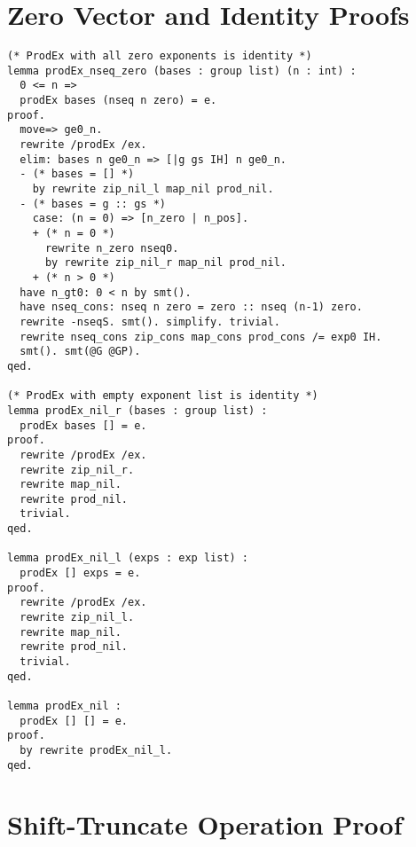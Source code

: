 \section{Zero Vector and Identity Proofs}
\label{sec:zero-vector-proofs}

\begin{lstlisting}[style=easycrypt, caption=Proof of Zero Vector Properties, breaklines=true, breakatwhitespace=true, frame=single, keepspaces=true]
(* ProdEx with all zero exponents is identity *)
lemma prodEx_nseq_zero (bases : group list) (n : int) :
  0 <= n =>
  prodEx bases (nseq n zero) = e.
proof.
  move=> ge0_n.
  rewrite /prodEx /ex.
  elim: bases n ge0_n => [|g gs IH] n ge0_n.
  - (* bases = [] *)
    by rewrite zip_nil_l map_nil prod_nil.
  - (* bases = g :: gs *)
    case: (n = 0) => [n_zero | n_pos].
    + (* n = 0 *)
      rewrite n_zero nseq0.
      by rewrite zip_nil_r map_nil prod_nil.
    + (* n > 0 *)
  have n_gt0: 0 < n by smt().
  have nseq_cons: nseq n zero = zero :: nseq (n-1) zero.  
  rewrite -nseqS. smt(). simplify. trivial.
  rewrite nseq_cons zip_cons map_cons prod_cons /= exp0 IH. 
  smt(). smt(@G @GP).
qed.

(* ProdEx with empty exponent list is identity *)
lemma prodEx_nil_r (bases : group list) :
  prodEx bases [] = e.
proof.
  rewrite /prodEx /ex.
  rewrite zip_nil_r.
  rewrite map_nil.
  rewrite prod_nil.
  trivial.
qed.

lemma prodEx_nil_l (exps : exp list) :
  prodEx [] exps = e.
proof.
  rewrite /prodEx /ex.
  rewrite zip_nil_l.
  rewrite map_nil.
  rewrite prod_nil.
  trivial.
qed.

lemma prodEx_nil :
  prodEx [] [] = e.
proof.
  by rewrite prodEx_nil_l. 
qed.
\end{lstlisting}

\section{Shift-Truncate Operation Proof}
\label{sec:shift-trunc-proofs}

